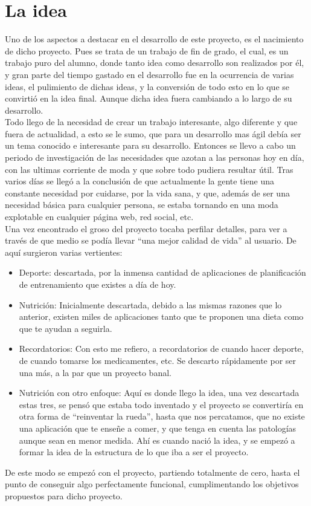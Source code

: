 
\section{La idea}
Uno de los aspectos a destacar en el desarrollo de este proyecto, es el nacimiento de dicho proyecto. Pues se trata de un trabajo de fin de grado, el cual, es un trabajo puro del alumno, donde tanto idea como desarrollo son realizados por él, y gran parte del tiempo gastado en el desarrollo fue en la ocurrencia de varias ideas, el pulimiento de dichas ideas, y la conversión de todo esto en lo que se convirtió en la idea final. Aunque dicha idea fuera cambiando a lo largo de su desarrollo.\\
Todo llego de la necesidad de crear un trabajo interesante, algo diferente y que fuera de actualidad, a esto se le sumo, que para un desarrollo mas ágil debía ser un tema conocido e interesante para su desarrollo. Entonces se llevo a cabo un periodo de investigación de las necesidades que azotan a las personas hoy en día, con las ultimas corriente de moda y que sobre todo pudiera resultar útil. Tras varios días se llegó a la conclusión de que actualmente la gente tiene una constante necesidad por cuidarse, por la vida sana, y que, además de ser una necesidad básica para cualquier persona, se estaba tornando en una moda explotable en cualquier página web, red social, etc.\\
Una vez encontrado el groso del proyecto tocaba perfilar detalles, para ver a través de que medio se podía llevar “una mejor calidad de vida” al usuario. De aquí surgieron varias vertientes:\\
\begin{itemize}
\item	Deporte: descartada, por la inmensa cantidad de aplicaciones de planificación de entrenamiento que existes a día de hoy.
\item	Nutrición: Inicialmente descartada, debido a las mismas razones que lo anterior, existen miles de aplicaciones tanto que te proponen una dieta como que te ayudan a seguirla.
\item	Recordatorios: Con esto me refiero, a recordatorios de cuando hacer deporte, de cuando tomarse los medicamentes, etc. Se descarto rápidamente por ser una más, a la par que un proyecto banal.
\item	Nutrición con otro enfoque: Aquí es donde llego la idea, una vez descartada estas tres, se pensó que estaba todo inventado y el proyecto se convertiría en otra forma de “reinventar la rueda”, hasta que nos percatamos, que no existe una aplicación que te enseñe a comer, y que tenga en cuenta las patologías aunque sean en menor medida. Ahí es cuando nació la idea, y se empezó a formar la idea de la estructura de lo que iba a ser el proyecto.

\end{itemize}
De este modo se empezó con el proyecto, partiendo totalmente de cero, hasta el punto de conseguir algo perfectamente funcional, cumplimentando los objetivos propuestos para dicho proyecto.

